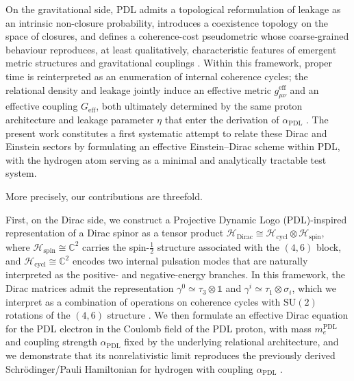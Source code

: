 \documentclass[11pt,a4paper]{article}
\theoremstyle{definition}
\newcommand{\PDL}{\mathrm{PDL}}
\newcommand{\Hspin}{\mathcal{H}_{\mathrm{spin}}}
\newcommand{\Hcycl}{\mathcal{H}_{\mathrm{cycl}}}
\newcommand{\HDirac}{\mathcal{H}_{\mathrm{Dirac}}}
\newcommand{\Geff}{G_{\mathrm{eff}}}
\newcommand{\alphaPDL}{\alpha_{\mathrm{PDL}}}
\newcommand{\etaL}{\eta} %
\begin{document}
On the gravitational side, PDL admits a topological reformulation of leakage as an intrinsic non-closure probability, introduces a coexistence topology on the space of closures, and defines a coherence-cost pseudometric whose coarse-grained behaviour reproduces, at least qualitatively, characteristic features of emergent metric structures and gravitational couplings \cite{A_Topological_Reformulation_in_the_Projective_Dynamic_Logo_Framework_Hierarchical_Coherence_Filtering_and_the_Exponent_18_in_PDL,PDL_Global_Mapping_Structures_Results_Open_Problems}. Within this framework, proper time is reinterpreted as an enumeration of internal coherence cycles; the relational density and leakage jointly induce an effective metric $g^{\mathrm{eff}}_{\mu\nu}$ and an effective coupling $\Geff$, both ultimately determined by the same proton architecture and leakage parameter $\etaL$ that enter the derivation of $\alphaPDL$ \cite{PDL,PDL_Global_Mapping_Structures_Results_Open_Problems,A_Topological_Reformulation_in_the_Projective_Dynamic_Logo_Framework_Hierarchical_Coherence_Filtering_and_the_Exponent_18_in_PDL,Hierarchical_Coherence_Filtering_and_the_Exponent_18_in_PDL}. The present work constitutes a first systematic attempt to relate these Dirac and Einstein sectors by formulating an effective Einstein–Dirac scheme within PDL, with the hydrogen atom serving as a minimal and analytically tractable test system.

More precisely, our contributions are threefold. 

First, on the Dirac side, we construct a Projective Dynamic Logo (PDL)-inspired representation of a Dirac spinor as a tensor product $\HDirac \cong \Hcycl \otimes \Hspin$, where $\Hspin \cong \mathbb{C}^2$ carries the spin-$\tfrac{1}{2}$ structure associated with the $(4,6)$ block, and $\Hcycl \cong \mathbb{C}^2$ encodes two internal pulsation modes that are naturally interpreted as the positive- and negative-energy branches. In this framework, the Dirac matrices admit the representation $\gamma^0 \simeq \tau_3 \otimes \mathbb{1}$ and $\gamma^i \simeq \tau_1 \otimes \sigma_i$, which we interpret as a combination of operations on coherence cycles with $\mathrm{SU}(2)$ rotations of the $(4,6)$ structure \cite{PDL,Relational_Emergence_of_Born_s_Rule_and_a_Golden_Ratio_Active_Surface_in_PDL}. We then formulate an effective Dirac equation for the PDL electron in the Coulomb field of the PDL proton, with mass $m_e^{\PDL}$ and coupling strength $\alphaPDL$ fixed by the underlying relational architecture, and we demonstrate that its nonrelativistic limit reproduces the previously derived Schrödinger/Pauli Hamiltonian for hydrogen with coupling $\alphaPDL$ \cite{Schodinger_PDL,Sketch_derivation_Schroedinger_PDL}. 
\end{document}
